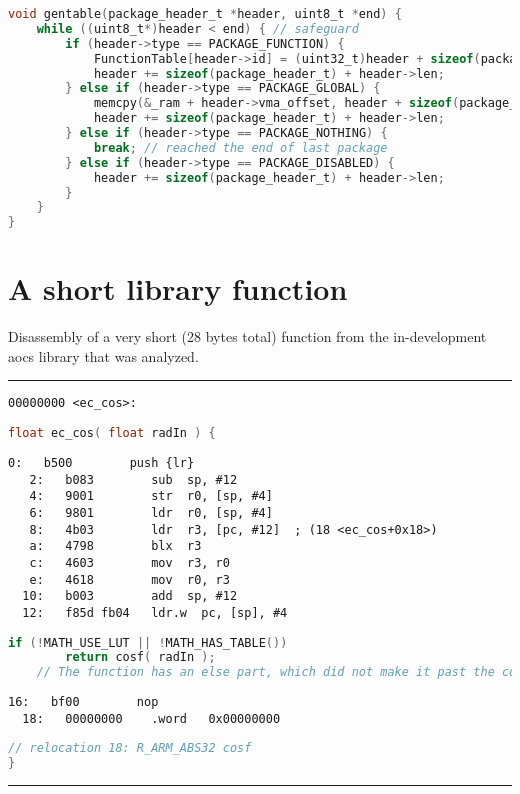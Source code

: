 \begin{appendices}
\begin{lstlisting}[language=C]
void gentable(package_header_t *header, uint8_t *end) {
	while ((uint8_t*)header < end) { // safeguard
		if (header->type == PACKAGE_FUNCTION) {
			FunctionTable[header->id] = (uint32_t)header + sizeof(package_header_t) + 1; // ARM Thumb jumps need odd addresses
			header += sizeof(package_header_t) + header->len;
		} else if (header->type == PACKAGE_GLOBAL) {
			memcpy(&_ram + header->vma_offset, header + sizeof(package_header_t), header->len);
			header += sizeof(package_header_t) + header->len;
		} else if (header->type == PACKAGE_NOTHING) {
			break; // reached the end of last package
		} else if (header->type == PACKAGE_DISABLED) {
			header += sizeof(package_header_t) + header->len;
		}
	}
}
\end{lstlisting}

\newpage
\section{A short library function}
\label{apx:cos}

Disassembly of a very short (28 bytes total) function from the in-development \gls{aocs} library that was analyzed.

\rule{\textwidth}{0.4pt}
\begin{lstlisting}[style=asm,frame=none]
00000000 <ec_cos>:
\end{lstlisting}
\begin{lstlisting}[language=C,frame=none]
float ec_cos( float radIn ) {
\end{lstlisting}
\begin{lstlisting}[style=asm,frame=none]
   0:	b500      	push {lr}
   2:	b083      	sub  sp, #12
   4:	9001      	str  r0, [sp, #4]
   6:	9801      	ldr  r0, [sp, #4]
   8:	4b03      	ldr  r3, [pc, #12]	; (18 <ec_cos+0x18>)
   a:	4798      	blx  r3
   c:	4603      	mov  r3, r0
   e:	4618      	mov  r0, r3
  10:	b003      	add  sp, #12
  12:	f85d fb04 	ldr.w  pc, [sp], #4
\end{lstlisting}
\begin{lstlisting}[language=C,frame=none]
	if (!MATH_USE_LUT || !MATH_HAS_TABLE())
		return cosf( radIn );
	// The function has an else part, which did not make it past the compilation step due to the shown preprocessor constants
\end{lstlisting}
\begin{lstlisting}[style=asm,frame=none]
  16:	bf00      	nop
  18:	00000000 	.word	0x00000000
\end{lstlisting}
\begin{lstlisting}[language=C,frame=none]
  // relocation 18: R_ARM_ABS32	cosf
}
\end{lstlisting}
\rule{\textwidth}{0.4pt}



\end{appendices}
